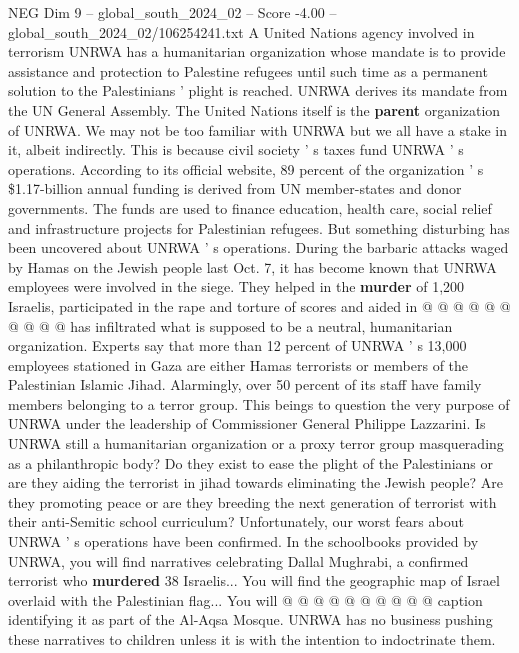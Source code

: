 \begin{textsample}{NEG Dim 9 – global\_south\_2024\_02 – Score -4.00 – global\_south\_2024\_02/106254241.txt}  \label{ex:f9_neg_346}
A United Nations agency involved in terrorism UNRWA has a humanitarian organization whose mandate is to provide assistance and protection to Palestine refugees until such time as a permanent solution to the Palestinians ' plight is reached.
UNRWA derives its mandate from the UN General Assembly.
The United Nations itself is the \textbf{parent} organization of UNRWA.
We may not be too familiar with UNRWA but we all have a stake in it, albeit indirectly.
This is because civil society ' s taxes fund UNRWA ' s operations.
According to its official website, 89 percent of the organization ' s \$1.17-billion annual funding is derived from UN member-states and donor governments.
The funds are used to finance education, health care, social relief and infrastructure projects for Palestinian refugees.
But something disturbing has been uncovered about UNRWA ' s operations.
During the barbaric attacks waged by Hamas on the Jewish people last Oct. 7, it has become known that UNRWA employees were involved in the siege.
They helped in the \textbf{murder} of 1,200 Israelis, participated in the rape and torture of scores and aided in @ @ @ @ @ @ @ @ @ @ has infiltrated what is supposed to be a neutral, humanitarian organization.
Experts say that more than 12 percent of UNRWA ' s 13,000 employees stationed in Gaza are either Hamas terrorists or members of the Palestinian Islamic Jihad.
Alarmingly, over 50 percent of its staff have family members belonging to a terror group.
This beings to question the very purpose of UNRWA under the leadership of Commissioner General Philippe Lazzarini.
Is UNRWA still a humanitarian organization or a proxy terror group masquerading as a philanthropic body?
Do they exist to ease the plight of the Palestinians or are they aiding the terrorist in jihad towards eliminating the Jewish people?
Are they promoting peace or are they breeding the next generation of terrorist with their anti-Semitic school curriculum?
Unfortunately, our worst fears about UNRWA ' s operations have been confirmed.
In the schoolbooks provided by UNRWA, you will find narratives celebrating Dallal Mughrabi, a confirmed terrorist who \textbf{murdered} 38 Israelis...
You will find the geographic map of Israel overlaid with the Palestinian flag...
You will @ @ @ @ @ @ @ @ @ @ caption identifying it as part of the Al-Aqsa Mosque.
UNRWA has no business pushing these narratives to children unless it is with the intention to indoctrinate them.

\end{textsample}
